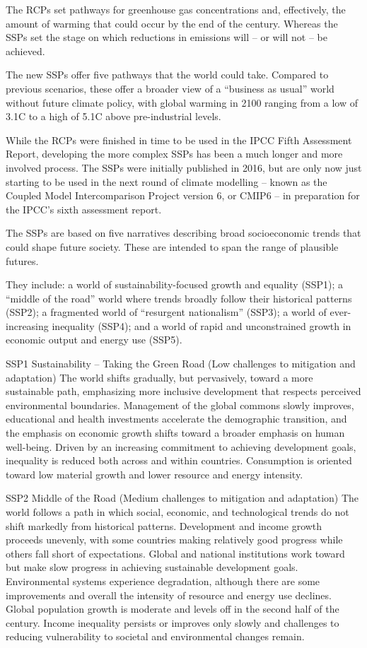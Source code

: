 \documentclass[
]{book}
\begin{document}
The RCPs set pathways for greenhouse gas concentrations and, effectively, the amount of warming that could occur by the end of the century. Whereas the SSPs set the stage on which reductions in emissions will -- or will not -- be achieved.

The new SSPs offer five pathways that the world could take. Compared to previous scenarios, these offer a broader view of a ``business as usual'' world without future climate policy, with global warming in 2100 ranging from a low of 3.1C to a high of 5.1C above pre-industrial levels.

While the RCPs were finished in time to be used in the IPCC Fifth Assessment Report, developing the more complex SSPs has been a much longer and more involved process. The SSPs were initially published in 2016, but are only now just starting to be used in the next round of climate modelling -- known as the Coupled Model Intercomparison Project version 6, or CMIP6 -- in preparation for the IPCC's sixth assessment report.

The SSPs are based on five narratives describing broad socioeconomic trends that could shape future society. These are intended to span the range of plausible futures.

They include: a world of sustainability-focused growth and equality (SSP1); a ``middle of the road'' world where trends broadly follow their historical patterns (SSP2); a fragmented world of ``resurgent nationalism'' (SSP3); a world of ever-increasing inequality (SSP4); and a world of rapid and unconstrained growth in economic output and energy use (SSP5).

SSP1 Sustainability -- Taking the Green Road (Low challenges to mitigation and adaptation)
The world shifts gradually, but pervasively, toward a more sustainable path, emphasizing more inclusive development that respects perceived environmental boundaries. Management of the global commons slowly improves, educational and health investments accelerate the demographic transition, and the emphasis on economic growth shifts toward a broader emphasis on human well-being. Driven by an increasing commitment to achieving development goals, inequality is reduced both across and within countries. Consumption is oriented toward low material growth and lower resource and energy intensity.

SSP2 Middle of the Road (Medium challenges to mitigation and adaptation)
The world follows a path in which social, economic, and technological trends do not shift markedly from historical patterns. Development and income growth proceeds unevenly, with some countries making relatively good progress while others fall short of expectations. Global and national institutions work toward but make slow progress in achieving sustainable development goals. Environmental systems experience degradation, although there are some improvements and overall the intensity of resource and energy use declines. Global population growth is moderate and levels off in the second half of the century. Income inequality persists or improves only slowly and challenges to reducing vulnerability to societal and environmental changes remain.
\end{document}
